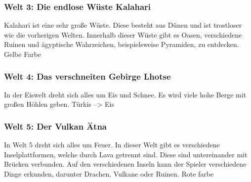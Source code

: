 \subsubsection{Welt 3: Die endlose Wüste Kalahari}
	Kalahari ist eine sehr große Wüste. Diese besteht aus Dünen und ist trostloser wie die vorherigen Welten. Innerhalb dieser Wüste gibt es Oasen, verschiedene Ruinen und ägyptische Wahrzeichen, beispielsweise Pyramiden, zu entdecken. Gelbe Farbe
	
\subsubsection{Welt 4: Das verschneiten Gebirge Lhotse}
	In der Eiswelt dreht sich alles um Eis und Schnee. Es wird viele hohe Berge mit großen Höhlen geben. Türkis --> Eis
	
\subsubsection{Welt 5: Der Vulkan Ätna}
	In Welt 5 dreht sich alles um Feuer. In dieser Welt gibt es verschiedene Inselplattformen, welche durch Lava getrennt sind. Diese sind untereinander mit Brücken verbunden. Auf den verschiedenen Inseln kann der Spieler verschiedene Dinge erkunden, darunter Drachen, Vulkane oder Ruinen. Rote farbe
